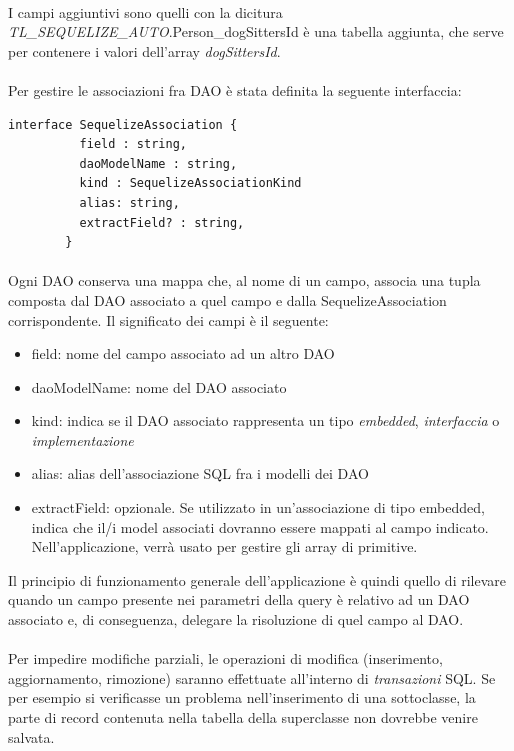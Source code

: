 \documentclass[a4paper, 12pt]{report}
\begin{document}
      \paragraph*{}
      I campi aggiuntivi sono quelli con la dicitura \emph{TL_SEQUELIZE_AUTO}.Person_dogSittersId è una tabella aggiunta, che serve per contenere i valori dell'array \emph{dogSittersId}.
      \paragraph*{}
      Per gestire le associazioni fra DAO è stata definita la seguente interfaccia:
      \begin{Verbatim}[samepage=true]
        interface SequelizeAssociation {
          field : string,
          daoModelName : string,
          kind : SequelizeAssociationKind
          alias: string,
          extractField? : string,
        }
      \end{Verbatim}
      \paragraph*{}
      Ogni DAO conserva una mappa che, al nome di un campo, associa una tupla composta dal DAO associato a quel campo e dalla SequelizeAssociation corrispondente.
      Il significato dei campi è il seguente:
      \begin{itemize}
        \item field: nome del campo associato ad un altro DAO
        \item daoModelName: nome del DAO associato
        \item kind: indica se il DAO associato rappresenta un tipo \emph{embedded}, \emph{interfaccia} o \emph{implementazione}
        \item alias: alias dell'associazione SQL fra i modelli dei DAO
        \item extractField: opzionale. Se utilizzato in un'associazione di tipo embedded, indica che il/i model associati dovranno essere mappati al campo indicato.
                            Nell'applicazione, verrà usato per gestire gli array di primitive.
      \end{itemize}
      Il principio di funzionamento generale dell'applicazione è quindi quello di rilevare quando un campo presente nei parametri della query è relativo ad un DAO associato e, di conseguenza, delegare la risoluzione di quel campo al DAO.
      \paragraph*{}
      Per impedire modifiche parziali, le operazioni di modifica (inserimento, aggiornamento, rimozione) saranno effettuate all'interno di \emph{transazioni} SQL.
      Se per esempio si verificasse un problema nell'inserimento di una sottoclasse, la parte di record contenuta nella tabella della superclasse non dovrebbe venire salvata.
\end{document}
